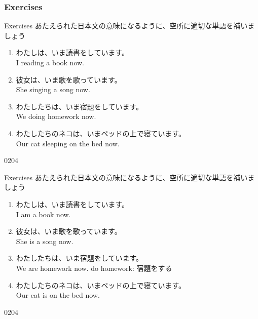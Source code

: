 \documentclass[aspectratio=169,xcolor={dvipsnames,table}]{beamer}
\newcommand{\myaudio}[1]{\href{#1}{\faVolumeUp}}
\begin{document}
\subsubsection{Exercises}
\begin{frame}[plain]{Exercises}
あたえられた日本文の意味になるように、空所に適切な単語を補いましょう

\begin{enumerate}
 \item わたしは、いま読書をしています。\\
I  reading a book now.\hfill{}
 \item 彼女は、いま歌を歌っています。\\
She  singing a song now.\hfill{}
 \item わたしたちは、いま宿題をしています。\\
We  doing homework now.\hfill{}
 \item わたしたちのネコは、いまベッドの上で寝ています。\\
Our cat  sleeping on the bed now.\hfill{}
\end{enumerate} 

\hfill{\tiny 0204}\,{\scriptsize \myaudio{./audio/021_is_ing_intro_02.mp3}}
\end{frame}
\begin{frame}[plain]{Exercises}
あたえられた日本文の意味になるように、空所に適切な単語を補いましょう

\begin{enumerate}
 \item わたしは、いま読書をしています。\\
I am  a book now.
 \item 彼女は、いま歌を歌っています。\\
She is  a song now.
 \item わたしたちは、いま宿題をしています。\\
We are   homework now.%
\hfill{\scriptsize do homework: 宿題をする}
 \item わたしたちのネコは、いまベッドの上で寝ています。\\
Our cat is  on the bed now.
\end{enumerate} 

\hfill{\tiny 0204}\,{\scriptsize \myaudio{./audio/021_is_ing_intro_02.mp3}}
\end{frame}
\end{document}
